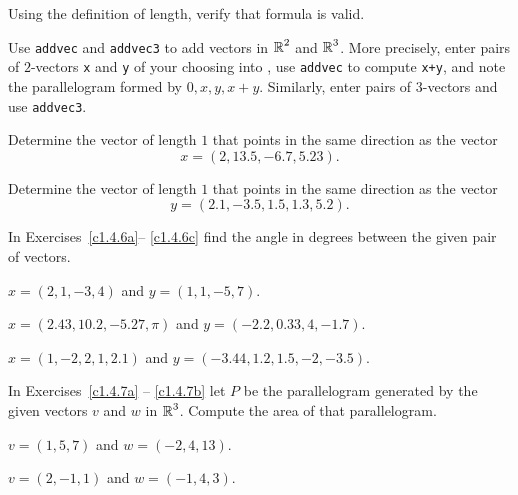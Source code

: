\documentclass{ximera}
\begin{document}
\begin{exercise}  \label{c1.4.9A}
Using the definition of length, verify that formula  
is valid.
\end{exercise}


\CEXER

\begin{exercise} \label{c1.4.4}
Use {\tt addvec} and {\tt addvec3} to add vectors in $\mbox{$\Bbb{R}$}^2$ and
$\mbox{$\Bbb{R}$}^3$.  More precisely, enter pairs of $2$-vectors {\tt x} and {\tt y} 
of your choosing into \Matlabp, use {\tt addvec} to compute {\tt x+y},
and note the parallelogram formed by $0,x,y,x+y$.  Similarly, enter 
pairs of $3$-vectors and use {\tt addvec3}.
\end{exercise}

\begin{exercise} \label{c1.4.5}
Determine the vector of length $1$ that points in the same direction
as the vector
\[
x=(2,13.5,-6.7,5.23).
\]
\end{exercise}

\begin{exercise} \label{c1.4.5b}
Determine the vector of length $1$ that points in the same direction
as the vector
\[
y=(2.1,-3.5,1.5,1.3,5.2).
\]
\end{exercise}

\noindent In Exercises~\ref{c1.4.6a}-- \ref{c1.4.6c} find the angle in
degrees between the given pair of vectors.
\begin{exercise} \label{c1.4.6a}
$x=(2,1,-3,4)$ and $y=(1,1,-5,7)$.
\end{exercise}
\begin{exercise} \label{c1.4.6b}
$x=(2.43, 10.2,-5.27,\pi)$ and $y= (-2.2,0.33,4,-1.7)$.
\end{exercise}
\begin{exercise} \label{c1.4.6c}
$x=(1,-2,2,1,2.1)$ and $y=(-3.44,1.2,1.5,-2,-3.5)$.
\end{exercise}

\noindent In Exercises~\ref{c1.4.7a} -- \ref{c1.4.7b} let $P$ be the 
parallelogram generated by the given vectors $v$ and $w$ in $\mbox{$\Bbb{R}$}^3$.  
Compute the area of that parallelogram.
\begin{exercise} \label{c1.4.7a}
$v=(1,5,7)$ and $w=(-2,4,13)$.
\end{exercise}
\begin{exercise} \label{c1.4.7b}
$v=(2,-1,1)$ and $w=(-1,4,3)$.
\end{exercise}
\end{document}
